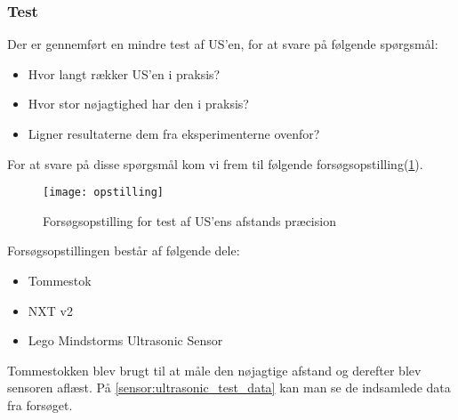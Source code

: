 \subsubsection{Test}
Der er gennemført en mindre test af US'en, for at svare på følgende spørgsmål:

\begin{itemize}
\item Hvor langt rækker US'en i praksis?
\item Hvor stor nøjagtighed har den i praksis?
\item Ligner resultaterne dem fra eksperimenterne ovenfor?
\end{itemize}

For at svare på disse spørgsmål kom vi frem til følgende forsøgsopstilling(\ref{sensor:ultrasonic_opstilling}).

\begin{figure}[h]
\centering
\texttt{[image: opstilling]}
\caption{Forsøgsopstilling for test af US'ens afstands præcision}
\label{sensor:ultrasonic_opstilling}
\end{figure}

Forsøgsopstillingen består af følgende dele:
\begin{itemize}
\item Tommestok
\item NXT v2
\item Lego Mindstorms Ultrasonic Sensor
\end{itemize}

Tommestokken blev brugt til at måle den nøjagtige afstand og derefter blev sensoren aflæst.
På \ref{sensor:ultrasonic_test_data} kan man se de indsamlede data fra forsøget.

